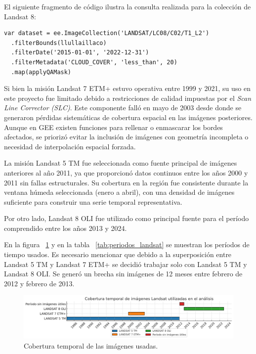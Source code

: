 El siguiente fragmento de código ilustra la consulta realizada para la colección de Landsat 8:

\begin{verbatim}
var dataset = ee.ImageCollection('LANDSAT/LC08/C02/T1_L2')
  .filterBounds(llullaillaco)
  .filterDate('2015-01-01', '2022-12-31')
  .filterMetadata('CLOUD_COVER', 'less_than', 20)
  .map(applyQAMask)
\end{verbatim}


Si bien la misión Landsat 7 ETM+ estuvo operativa entre 1999 y 2021, su uso en este proyecto fue limitado debido a restricciones de calidad impuestas por el \textit{Scan Line Corrector (SLC)}. Este componente falló en mayo de 2003 desde donde se generaron pérdidas sistemáticas de cobertura espacial en las imágenes posteriores. Aunque en GEE existen funciones para rellenar o enmascarar los bordes afectados, se priorizó evitar la inclusión de imágenes con geometría incompleta o necesidad de interpolación espacial forzada.

La misión Landsat 5 TM fue seleccionada como fuente principal de imágenes anteriores al año 2011, ya que proporcionó datos continuos entre los años 2000 y 2011 sin fallas estructurales. Su cobertura en la región fue consistente durante la ventana húmeda seleccionada (enero a abril), con una densidad de imágenes suficiente para construir una serie temporal representativa.

Por otro lado, Landsat 8 OLI fue utilizado como principal fuente para el período comprendido entre los años 2013 y 2024. 

En la figura ~\ref{fig:cob_temporal} y en la tabla ~\ref{tab:periodos_landsat} se muestran los períodos de tiempo usados. Es necesario mencionar que debido a la superposición entre Landsat 5 TM y Landsat 7 ETM+ se decidió trabajar solo con Landsat 5 TM y Landsat 8 OLI. Se generó un brecha sin imágenes de 12 meses entre febrero de 2012 y febrero de 2013.

\begin{figure}[ht]
        \centering
        \includegraphics[scale=.4]
        {Figures/fig11.png}
        \caption{Cobertura temporal de las imágenes usadas.}
        \label{fig:cob_temporal}
\end{figure}

